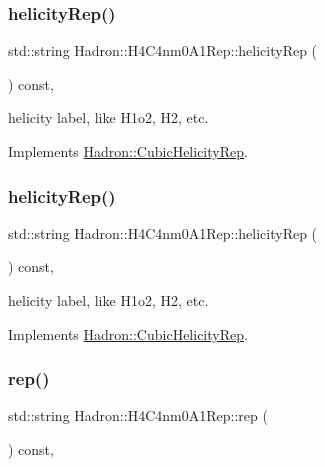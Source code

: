 \subsubsection{\texorpdfstring{helicityRep()}{helicityRep()}\hspace{0.1cm}{\footnotesize\ttfamily [2/3]}}
{\footnotesize\ttfamily std\+::string Hadron\+::\+H4\+C4nm0\+A1\+Rep\+::helicity\+Rep (\begin{DoxyParamCaption}{ }\end{DoxyParamCaption}) const\hspace{0.3cm}{\ttfamily [inline]}, {\ttfamily [virtual]}}

helicity label, like H1o2, H2, etc. 

Implements \mbox{\hyperlink{structHadron_1_1CubicHelicityRep_af1096946b7470edf0a55451cc662f231}{Hadron\+::\+Cubic\+Helicity\+Rep}}.

\mbox{\label{structHadron_1_1H4C4nm0A1Rep_af7a02623676d7d91efa31e3daf15ed8c}} 
\subsubsection{\texorpdfstring{helicityRep()}{helicityRep()}\hspace{0.1cm}{\footnotesize\ttfamily [3/3]}}
{\footnotesize\ttfamily std\+::string Hadron\+::\+H4\+C4nm0\+A1\+Rep\+::helicity\+Rep (\begin{DoxyParamCaption}{ }\end{DoxyParamCaption}) const\hspace{0.3cm}{\ttfamily [inline]}, {\ttfamily [virtual]}}

helicity label, like H1o2, H2, etc. 

Implements \mbox{\hyperlink{structHadron_1_1CubicHelicityRep_af1096946b7470edf0a55451cc662f231}{Hadron\+::\+Cubic\+Helicity\+Rep}}.

\mbox{\label{structHadron_1_1H4C4nm0A1Rep_a3f4b3af1601f3bc5c2a954c3e8c13c18}} 
\subsubsection{\texorpdfstring{rep()}{rep()}\hspace{0.1cm}{\footnotesize\ttfamily [1/5]}}
{\footnotesize\ttfamily std\+::string Hadron\+::\+H4\+C4nm0\+A1\+Rep\+::rep (\begin{DoxyParamCaption}{ }\end{DoxyParamCaption}) const\hspace{0.3cm}{\ttfamily [inline]}, {\ttfamily [virtual]}}



